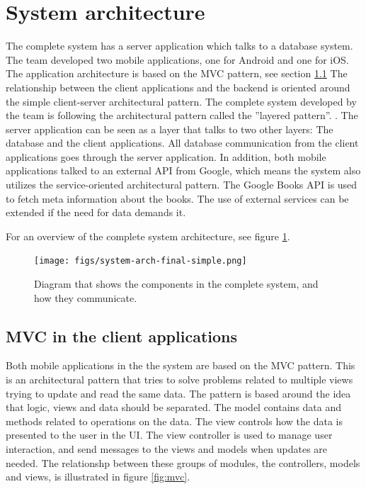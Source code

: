 \section{System architecture}
The complete system has a server application which talks to a database system. The team developed two mobile applications, one for Android and one for iOS. The application architecture is based on the \gls{MVC} pattern, see section \ref{arch:mvc} The relationship between the client applications and the \gls{backend} is oriented around the simple client-server architectural pattern. \cite[p.217-219]{progark} The complete system developed by the team is following the architectural pattern called the ''layered pattern''. \cite[p. 205-210]{progark}. The server application can be seen as a layer that talks to two other layers: The database and the client applications. All database communication from the client applications goes through the server application.  In addition, both mobile applications talked to an external \gls{API} from Google\cite{google-books-api}, which means the system also utilizes the service-oriented architectural pattern. \cite[p. 222-226]{progark} The Google Books \gls{API} is used to fetch meta information about the books. The use of external services can be extended if the need for data demands it. 

For an overview of the complete system architecture, see figure \ref{fig:system-arch-final-simple}.

\begin{figure}
    \begin{center}
        \texttt{[image: figs/system-arch-final-simple.png]}
        \caption{Diagram that shows the components in the complete system, and how they communicate.}
        \label{fig:system-arch-final-simple}
    \end{center}
\end{figure}



\subsection{\gls{MVC} in the client applications}
\label{arch:mvc}
Both mobile applications in the the system are based on the \gls{MVC} pattern. This is an architectural pattern that tries to solve problems related to multiple views trying to update and read the same data. \cite[p. 212-215]{progark} The pattern is based around the idea that logic, views and data should be separated. The model contains data and methods related to operations on the data. The view controls how the data is presented to the user in the \gls{UI}. The view controller is used to manage user interaction, and send messages to the views and models when updates are needed. The relationshp between these groups of modules, the controllers, models and views, is illustrated in figure \ref{fig:mvc}. 

